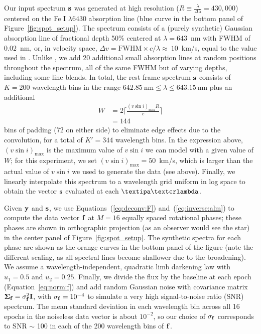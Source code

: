 \documentclass[modern]{aastex631}
\begin{document}
Our input spectrum ${\mathbf{s}}$ was generated at high resolution ($R \equiv \frac{\lambda}{\Delta\lambda} = 430,000$) centered on the Fe I $\lambda 6430$ absorption line (blue curve in the bottom panel of Figure~\ref{fig:spot_setup}).
%
The spectrum consists of a (purely synthetic) Gaussian absorption line of fractional depth 50\% centered at $\lambda = 643$~nm with FWHM of $0.02$~nm, or, in velocity space, $\Delta v = \mathrm{FWHM} \times c / \lambda \approx~10$~km/s, equal to the value used in \citet{Vogt1987}. 
%
Unlike \citet{Vogt1987}, we add 20 additional small absorption lines at random positions throughout the spectrum, all of the same FWHM but of varying depths, including some line blends. 
In total, the rest frame spectrum ${\mathbf{s}}$ consists of $K = 200$ wavelength bins in the range $642.85~\mathrm{nm} \leq \lambda \leq 643.15~\mathrm{nm}$ plus an additional
%
\begin{align}
    W & = 2 \bigg\lceil \frac{(v\sin i)_\mathrm{max}R}{c} \bigg\rceil \nonumber  \\
      & = 144
\end{align}
%
bins of padding (72 on either side) to eliminate edge effects due to the convolution, for a total of $K' = 344$ wavelength bins. 
In the expression above, $(v\sin i)_\mathrm{max}$ is the maximum value of $v\sin i$ we can model with a given value of $W$; for this experiment, we set $(v\sin i)_\mathrm{max}=50$~km/s, which is larger than the actual value of $v\sin i$ we used to generate the data (see above).
Finally, we linearly interpolate this spectrum to a wavelength grid uniform in log space to obtain the vector ${\mathbf{s}}$ evaluated at each $\lnlam$.

Given ${\mathbf{y}}$ and ${\mathbf{s}}$, we use Equations~(\ref{eq:deconv:F}) and~(\ref{eq:inverse:alm}) to compute the data vector ${\mathbf{f}}$ at $M = 16$ equally spaced rotational phases; these phases are shown in orthographic projection (as an observer would see the star) in the center panel of Figure~\ref{fig:spot_setup}. 
The synthetic spectra for each phase are shown as the orange curves in the bottom panel of the figure (note the different scaling, as all spectral lines become shallower due to the broadening). 
We assume a wavelength-independent, quadratic limb darkening law with $u_1 = 0.5$ and $u_2 = 0.25$. 
Finally, we divide the flux by the baseline at each epoch (Equation~\ref{eq:norm:f}) and add random Gaussian noise with covariance matrix ${\mathbf{\Sigma}}_{\mathbf{f}} = \sigma_{\mathbf{f}}^2 \mathbf{I}$, with $\sigma_{\mathbf{f}} = 10^{-4}$ to simulate a very high signal-to-noise ratio (SNR) spectrum. 
The mean standard deviation in each wavelength bin across all 16 epochs in the noiseless data vector is about $10^{-2}$, so our choice of $\sigma_{\mathbf{f}}$ corresponds to SNR $\sim$ 100 in each of the 200 wavelength bins of ${\mathbf{f}}$.
\end{document}

